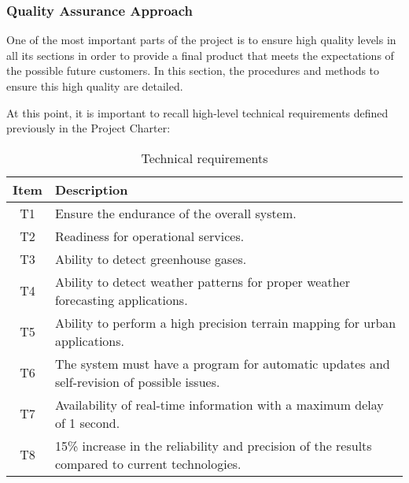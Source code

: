 \subsubsection{Quality Assurance Approach}
One of the most important parts of the project is to ensure high quality levels in all its sections in order to provide a final product that meets the expectations of the possible future customers. In this section, the procedures and methods to ensure this high quality are detailed. 

At this point, it is important to recall high-level technical requirements defined previously in the Project Charter:
\begin{table}[H]
	\centering
	\begin{tabular}{c p{13.3cm}}
		
		\toprule[2pt]
		
		\textbf{Item} &  \textbf{Description}\\
		
		\midrule [1.5pt]
		
		T1 & Ensure the endurance of the overall system.\vspace{0.2cm}\\
		
		\midrule
		
		T2 & Readiness for operational services.\vspace{0.2cm}\\
		
		\midrule
		
		T3 & Ability to detect greenhouse gases.\vspace{0.2cm}\\
		
		\midrule
		
		T4 & Ability to detect weather patterns for proper weather forecasting applications.\vspace{0.2cm}\\
		
		\midrule
		
		T5 & Ability to perform a high precision terrain mapping for urban applications.\vspace{0.2cm}\\
		
		\midrule
		
		T6 & The system must have a program for automatic updates and self-revision of possible issues.\vspace{0.2cm}\\
		
		\midrule
		
		T7 & Availability of real-time information with a maximum delay of 1 second.\vspace{0.2cm}\\
		
		\midrule
		
		T8 & 15\% increase in the reliability and precision of the results compared to current technologies.\vspace{0.2cm}\\
		
		\bottomrule[2pt]
		
	\end{tabular}
	\caption{Technical requirements}
\end{table}

